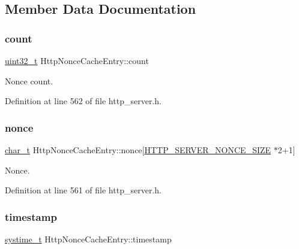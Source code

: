 \subsection{Member Data Documentation}
\mbox{\label{structHttpNonceCacheEntry_af4406b01e0c26184c5374d4287b6a07b}} 
\subsubsection{\texorpdfstring{count}{count}}
{\footnotesize\ttfamily \hyperlink{stdint_8h_a435d1572bf3f880d55459d9805097f62}{uint32\+\_\+t} Http\+Nonce\+Cache\+Entry\+::count}



Nonce count. 



Definition at line 562 of file http\+\_\+server.\+h.

\mbox{\label{structHttpNonceCacheEntry_a49cca6a1603b77d4d91b2b7f91db726b}} 
\subsubsection{\texorpdfstring{nonce}{nonce}}
{\footnotesize\ttfamily \hyperlink{compiler__port_8h_a40bb5262bf908c328fbcfbe5d29d0201}{char\+\_\+t} Http\+Nonce\+Cache\+Entry\+::nonce\mbox{[}\hyperlink{http__server_8h_abdefce676451bc1bf439d264f510abd7}{H\+T\+T\+P\+\_\+\+S\+E\+R\+V\+E\+R\+\_\+\+N\+O\+N\+C\+E\+\_\+\+S\+I\+ZE} $\ast$2+1\mbox{]}}



Nonce. 



Definition at line 561 of file http\+\_\+server.\+h.

\mbox{\label{structHttpNonceCacheEntry_aeb380011ddae3854b054d0a06ce7af97}} 
\subsubsection{\texorpdfstring{timestamp}{timestamp}}
{\footnotesize\ttfamily \hyperlink{compiler__port_8h_ae3e32a98d431a02106616da3071832dd}{systime\+\_\+t} Http\+Nonce\+Cache\+Entry\+::timestamp}



